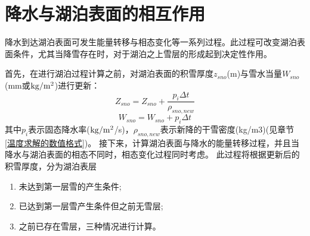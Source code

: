 \section{降水与湖泊表面的相互作用}
降水到达湖泊表面可发生能量转移与相态变化等一系列过程。此过程可改变湖泊表面条件，尤其当降雪存在时，对于湖泊之上雪层的形成起到决定性作用。


首先，在进行湖泊过程计算之前，对湖泊表面的积雪厚度$z_{sno}$(m)与雪水当量$W_{sno}$(mm或$\rm kg/m^2$)进行更新：
\begin{equation}
Z_{sno}=Z_{sno}+\frac{p_{i} \Delta t}{\rho_{sno,new}}
\end{equation}
\begin{equation}
W_{sno}=W_{sno}+p_{i} \Delta t
\end{equation}
其中$p_i$表示固态降水率($\rm kg/m^2$/s)，$\rho_{sno,new}$表示新降的干雪密度(kg/m3)(见章节  \ref{温度求解的数值格式})。
接下来，计算湖泊表面与降水的能量转移过程，并且当降水与湖泊表面的相态不同时，相态变化过程同时考虑。
此过程将根据更新后的积雪厚度，分为湖泊表层
\begin{enumerate}
    \item 未达到第一层雪的产生条件;
    \item 已达到第一层雪产生条件但之前无雪层;
    \item 之前已存在雪层，三种情况进行计算。
\end{enumerate}

